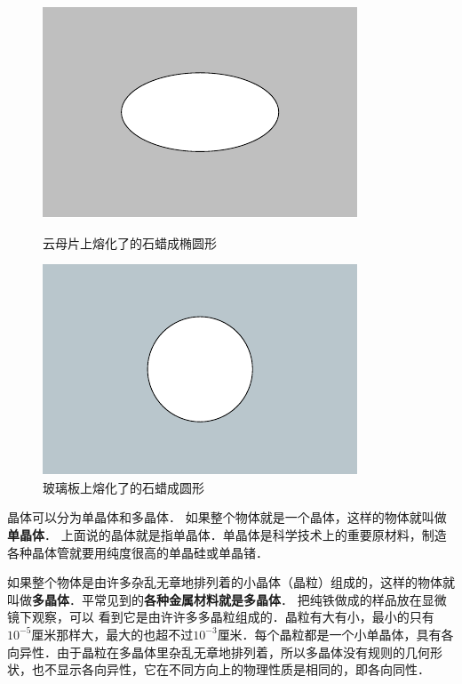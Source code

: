 \begin{figure}[htbp]
    \centering
    \begin{minipage}{0.47\linewidth}
    	\centering
    	\includegraphics{fig/B/4-2.pdf}
    	\caption{云母片上熔化了的石蜡成椭圆形}\label{fig_B_4-2}
    \end{minipage}
    \hfill
    \begin{minipage}{0.47\linewidth}
    	\centering
    	\includegraphics{fig/B/4-3.pdf}
    	\caption{玻璃板上熔化了的石蜡成圆形}\label{fig_B_4-3}
    \end{minipage}
\end{figure}


晶体可以分为单晶体和多晶体．
如果整个物体就是一个晶体，这样的物体就叫做\textbf{单晶体}．
上面说的晶体就是指单晶体．单晶体是科学技术上的重要原材料，制造各种晶体管就要用纯度很高的单晶硅或单晶锗．

如果整个物体是由许多杂乱无章地排列着的小晶体（晶粒）组成的，这样的物体就叫做\textbf{多晶体}．平常见到的\textbf{各种金属材料就是多晶体}．
把纯铁做成的样品放在显微镜下观察，可以
看到它是由许许多多晶粒组成的．晶粒有大有小，最小的只有$10^{-5}$厘米那样大，最大的也超不过$10^{-3}$厘米．每个晶粒都是一个小单晶体，具有各向异性．由于晶粒在多晶体里杂乱无章地排列着，所以多晶体没有规则的几何形状，也不显示各向异性，它在不同方向上的物理性质是相同的，即各向同性．

